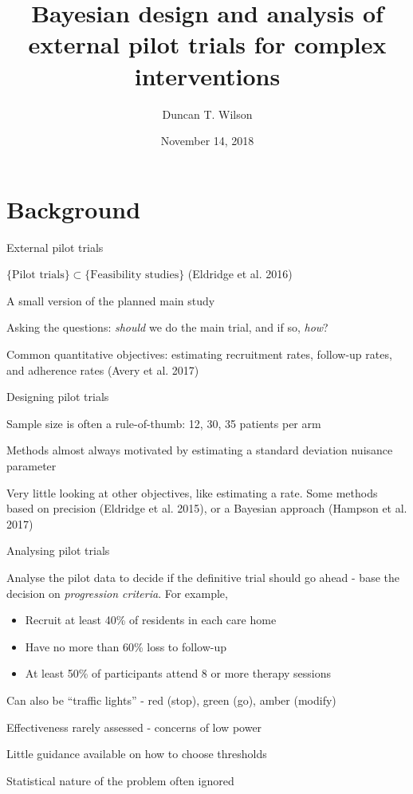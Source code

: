 \documentclass[
  ignorenonframetext,
]{beamer}
\title{Bayesian design and analysis of external pilot trials for complex
interventions}
\author{Duncan T. Wilson}
\date{November 14, 2018}
\providecommand{\tightlist}{%
  \setlength{\itemsep}{0pt}\setlength{\parskip}{0pt}}
\begin{document}
\frame{\titlepage}

\hypertarget{background}{%
\section{Background}\label{background}}

\begin{frame}{External pilot trials}
\protect\hypertarget{external-pilot-trials}{}

\(\{\text{Pilot trials}\} \subset \{\text{Feasibility studies}\}\)
(Eldridge et al. 2016)

A small version of the planned main study

Asking the questions: \emph{should} we do the main trial, and if so,
\emph{how}?

Common quantitative objectives: estimating recruitment rates, follow-up
rates, and adherence rates (Avery et al. 2017)

\end{frame}

\begin{frame}{Designing pilot trials}
\protect\hypertarget{designing-pilot-trials}{}

Sample size is often a rule-of-thumb: 12, 30, 35 patients per arm

Methods almost always motivated by estimating a standard deviation
nuisance parameter

Very little looking at other objectives, like estimating a rate. Some
methods based on precision (Eldridge et al. 2015), or a Bayesian
approach (Hampson et al. 2017)

\end{frame}

\begin{frame}{Analysing pilot trials}
\protect\hypertarget{analysing-pilot-trials}{}

Analyse the pilot data to decide if the definitive trial should go ahead
- base the decision on \emph{progression criteria}. For example,

\begin{itemize}
\tightlist
\item
  Recruit at least 40\% of residents in each care home
\item
  Have no more than 60\% loss to follow-up
\item
  At least 50\% of participants attend 8 or more therapy sessions
\end{itemize}

Can also be ``traffic lights'' - red (stop), green (go), amber (modify)

Effectiveness rarely assessed - concerns of low power

Little guidance available on how to choose thresholds

Statistical nature of the problem often ignored

\end{frame}
\end{document}
